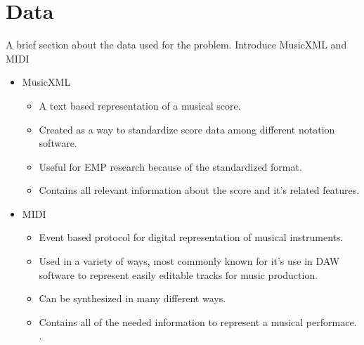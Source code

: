 \section{Data}
A brief section about the data used for the problem. Introduce MusicXML and MIDI
\begin{itemize}
    \item MusicXML
    \begin{itemize}
        \item A text based representation of a musical score. 
        \item Created as a way to standardize score data among different notation software. 
        \item Useful for EMP research because of the standardized format. 
        \item Contains all relevant information about the score and it's related features. 
    \end{itemize}
    \item MIDI 
    \begin{itemize}
        \item Event based protocol for digital representation of musical instruments. 
        \item Used in a variety of ways, most commonly known for it's use in DAW software to represent easily editable tracks for music production. 
        \item Can be synthesized in many different ways. 
        \item Contains all of the needed information to represent a musical performace. . 
    \end{itemize}
    
\end{itemize}



